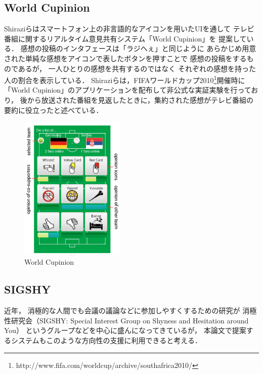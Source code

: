 \subsection{World Cupinion}

Shiraziらはスマートフォン上の非言語的なアイコンを用いたUIを通して
テレビ番組に関するリアルタイム意見共有システム「World Cupinion」を
提案している\cite{SahamiShirazi:2011:RNO:1978942.1978985}．
感想の投稿のインタフェースは「ラジへぇ」と同じように
あらかじめ用意された単純な感想をアイコンで表したボタンを押すことで
感想の投稿をするものであるが，
一人ひとりの感想を共有するのではなく
それぞれの感想を持った人の割合を表示している．
Shiraziらは，FIFAワールドカップ2010\footnote{http://www.fifa.com/worldcup/archive/southafrica2010/}開催時に
「World Cupinion」のアプリケーションを配布して非公式な実証実験を行っており，
後から放送された番組を見返したときに，集約された感想がテレビ番組の要約に役立ったと述べている．


\begin{figure}[H]
\centering
\includegraphics[width=5cm]{images/worldcupinion.png}
\caption{World Cupinion}
\label{worldcupinion}
\end{figure}


\subsection{SIGSHY}

近年，
消極的な人間でも会議の議論などに参加しやすくするための研究が
消極性研究会（SIGSHY: Special Interest Group on Shyness and Hesitation around You）
というグループなどを中心に盛んになってきているが\cite{kurihara2016}，
本論文で提案するシステムもこのような方向性の支援に利用できると考える．